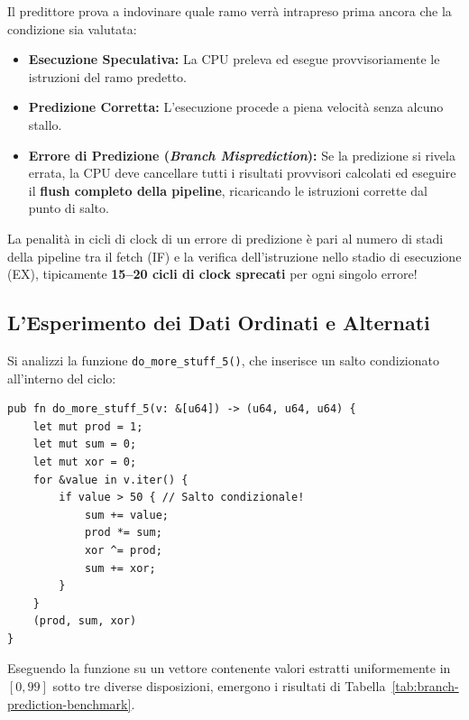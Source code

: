 Il predittore prova a indovinare quale ramo verr\`a intrapreso prima ancora che la condizione sia valutata:
\begin{itemize}
    \item \textbf{Esecuzione Speculativa:} La CPU preleva ed esegue provvisoriamente le istruzioni del ramo predetto.
    \item \textbf{Predizione Corretta:} L'esecuzione procede a piena velocit\`a senza alcuno stallo.
    \item \textbf{Errore di Predizione (\textit{Branch Misprediction}):} Se la predizione si rivela errata, la CPU deve cancellare tutti i risultati provvisori calcolati ed eseguire il \textbf{flush completo della pipeline}, ricaricando le istruzioni corrette dal punto di salto.
\end{itemize}

\begin{property}
La penalit\`a in cicli di clock di un errore di predizione \`e pari al numero di stadi della pipeline tra il fetch (IF) e la verifica dell'istruzione nello stadio di esecuzione (EX), tipicamente \textbf{15--20 cicli di clock sprecati} per ogni singolo errore!
\end{property}

\FloatBarrier
\subsection{L'Esperimento dei Dati Ordinati e Alternati}
\label{subsec:esperimento-branch-prediction}

Si analizzi la funzione \texttt{do\_more\_stuff\_5()}, che inserisce un salto condizionato all'interno del ciclo:

\begin{lstlisting}[style=rustcode,caption={Presenza di salto condizionato all'interno del loop.}]
pub fn do_more_stuff_5(v: &[u64]) -> (u64, u64, u64) {
    let mut prod = 1;
    let mut sum = 0;
    let mut xor = 0;
    for &value in v.iter() {
        if value > 50 { // Salto condizionale!
            sum += value;
            prod *= sum;
            xor ^= prod;
            sum += xor;
        }
    }
    (prod, sum, xor)
}
\end{lstlisting}

Eseguendo la funzione su un vettore contenente valori estratti uniformemente in $[0, 99]$ sotto tre diverse disposizioni, emergono i risultati di Tabella~\ref{tab:branch-prediction-benchmark}.


